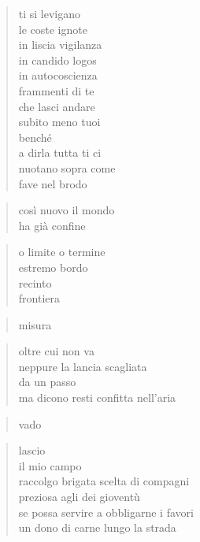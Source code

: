 	\begin{verse}
		ti si levigano\\
		le coste ignote\\
		in liscia vigilanza\\
		in candido logos\\
		in autocoscienza\\
		frammenti di te\\
		che lasci andare\\
		subito meno tuoi\\
		benché\\
		a dirla tutta ti ci\\
		nuotano sopra come\\
		fave nel brodo
	\end{verse}

\clearpage



	\begin{verse}
		così nuovo il mondo\\
		ha già confine
	\end{verse}

	\begin{verse}
		o limite o termine\\
		estremo bordo\\
		recinto\\
		frontiera
	\end{verse}

	\begin{verse}
		misura
	\end{verse}

	\begin{verse}
		oltre cui non va\\
		neppure la lancia scagliata\\
		da un passo\\
		ma dicono resti confitta nell’aria
	\end{verse}

	\begin{verse}
		vado
	\end{verse}

	\begin{verse}
		lascio\\
		il mio campo\\
		raccolgo brigata scelta di compagni\\
		preziosa agli dei gioventù\\
		se possa servire a obbligarne i favori\\
		un dono di carne lungo la strada
	\end{verse}

